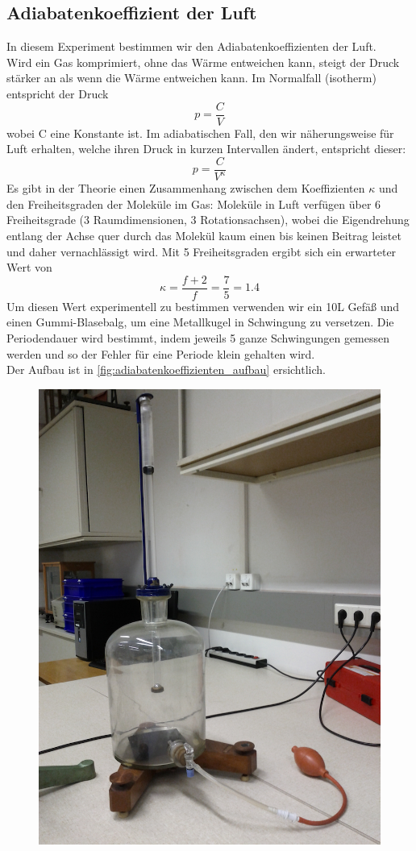 \documentclass[12pt,a4paper]{article}
\begin{document}
\begin{multicols}{2}
\pagebreak

\section{Adiabatenkoeffizient der Luft}
In diesem Experiment bestimmen wir den Adiabatenkoeffizienten der Luft. \\
Wird ein Gas komprimiert, ohne das Wärme entweichen kann, steigt der Druck stärker an als wenn die Wärme entweichen kann. Im Normalfall (isotherm) entspricht der Druck
$$p = \frac{C}{V}$$
wobei C eine Konstante ist.
Im adiabatischen Fall, den wir näherungsweise für Luft erhalten, welche ihren Druck in kurzen Intervallen ändert, entspricht dieser:
$$p = \frac{C}{V^\kappa}$$
Es gibt in der Theorie einen Zusammenhang zwischen dem Koeffizienten $\kappa$ und den Freiheitsgraden der Moleküle im Gas: Moleküle in Luft verfügen über 6 Freiheitsgrade (3 Raumdimensionen, 3 Rotationsachsen), wobei die Eigendrehung entlang der Achse quer durch das Molekül kaum einen bis keinen Beitrag leistet und daher vernachlässigt wird. Mit 5 Freiheitsgraden ergibt sich ein erwarteter Wert von
$$\kappa = \frac{f+2}{f} = \frac{7}{5} = 1.4$$
Um diesen Wert experimentell zu bestimmen verwenden wir ein 10L Gefäß und einen Gummi-Blasebalg, um eine Metallkugel in Schwingung zu versetzen. Die Periodendauer wird bestimmt, indem jeweils 5 ganze Schwingungen gemessen werden und so der Fehler für eine Periode klein gehalten wird.\\
Der Aufbau ist in \ref{fig:adiabatenkoeffizienten_aufbau} ersichtlich.
\begin{figure}[H]
	\centering
	\includegraphics[scale=0.25]{./figure/koeffizient.png}

\end{figure}
\end{multicols}
\end{document}
